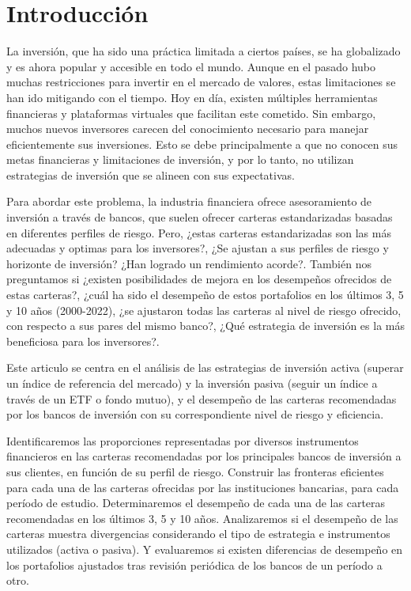 \documentclass[a4paper,fleqn]{cas-sc}
\begin{document}


\section{Introducción}

La inversión, que ha sido una práctica limitada a ciertos países, se ha globalizado y es ahora popular y accesible en todo el mundo. Aunque en el pasado hubo muchas restricciones para invertir en el mercado de valores, estas limitaciones se han ido mitigando con el tiempo. Hoy en día, existen múltiples herramientas financieras y plataformas virtuales que facilitan este cometido. Sin embargo, muchos nuevos inversores carecen del conocimiento necesario para manejar eficientemente sus inversiones. Esto se debe principalmente a que no conocen sus metas financieras y limitaciones de inversión, y por lo tanto, no utilizan estrategias de inversión que se alineen con sus expectativas.

Para abordar este problema, la industria financiera ofrece asesoramiento de inversión a través de bancos, que suelen ofrecer carteras estandarizadas basadas en diferentes perfiles de riesgo. Pero, ¿estas carteras estandarizadas son las más adecuadas y optimas para los inversores?, ¿Se ajustan a sus perfiles de riesgo y horizonte de inversión? ¿Han logrado un rendimiento acorde?. También nos preguntamos si ¿existen posibilidades de mejora en los desempeños ofrecidos de estas carteras?, ¿cuál ha sido el desempeño de estos portafolios en los últimos 3, 5 y 10 años (2000-2022), ¿se ajustaron todas las carteras al nivel de riesgo ofrecido, con respecto a sus pares del mismo banco?, ¿Qué estrategia de inversión es la más beneficiosa para los inversores?.

Este articulo se centra en el análisis de las estrategias de inversión activa (superar un índice de referencia del mercado) y la inversión pasiva (seguir un índice a través de un ETF o fondo mutuo), y el desempeño de las carteras recomendadas por los bancos de inversión con su correspondiente nivel de riesgo y eficiencia. 

Identificaremos las proporciones representadas por diversos instrumentos financieros en las carteras recomendadas por los principales bancos de inversión a sus clientes, en función de su perfil de riesgo. Construir las fronteras eficientes para cada una de las carteras ofrecidas por las instituciones bancarias, para cada período de estudio. Determinaremos el desempeño de cada una de las carteras recomendadas en los últimos 3, 5 y 10 años. Analizaremos si el desempeño de las carteras muestra divergencias considerando el tipo de estrategia e instrumentos utilizados (activa o pasiva). Y evaluaremos si existen diferencias de desempeño en los portafolios ajustados tras revisión periódica de los bancos de un período a otro.
\end{document}
